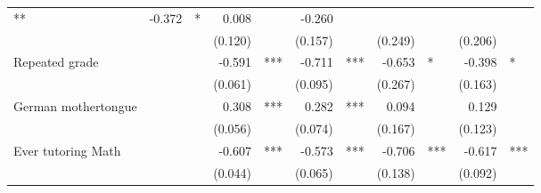\documentclass{article}
\begin{document}
\begin{table}[!h]
\begin{tabular}{lllllllllll}
  \multicolumn{1}{l}{**} &
  \multicolumn{1}{r}{-0.372} &
  \multicolumn{1}{l}{*} &
  \multicolumn{1}{r}{0.008} &
  \multicolumn{1}{l}{} &
  \multicolumn{1}{r}{-0.260} &
  \multicolumn{1}{l}{} \\
\multicolumn{1}{l}{} &
  \multicolumn{1}{r}{} &
  \multicolumn{1}{l}{} &
  \multicolumn{1}{r}{(0.120)} &
  \multicolumn{1}{l}{} &
  \multicolumn{1}{r}{(0.157)} &
  \multicolumn{1}{l}{} &
  \multicolumn{1}{r}{(0.249)} &
  \multicolumn{1}{l}{} &
  \multicolumn{1}{r}{(0.206)} &
  \multicolumn{1}{l}{} \\
\multicolumn{1}{l}{Repeated grade} &
  \multicolumn{1}{r}{} &
  \multicolumn{1}{l}{} &
  \multicolumn{1}{r}{-0.591} &
  \multicolumn{1}{l}{***} &
  \multicolumn{1}{r}{-0.711} &
  \multicolumn{1}{l}{***} &
  \multicolumn{1}{r}{-0.653} &
  \multicolumn{1}{l}{*} &
  \multicolumn{1}{r}{-0.398} &
  \multicolumn{1}{l}{*} \\
\multicolumn{1}{l}{} &
  \multicolumn{1}{r}{} &
  \multicolumn{1}{l}{} &
  \multicolumn{1}{r}{(0.061)} &
  \multicolumn{1}{l}{} &
  \multicolumn{1}{r}{(0.095)} &
  \multicolumn{1}{l}{} &
  \multicolumn{1}{r}{(0.267)} &
  \multicolumn{1}{l}{} &
  \multicolumn{1}{r}{(0.163)} &
  \multicolumn{1}{l}{} \\
\multicolumn{1}{l}{German mothertongue} &
  \multicolumn{1}{r}{} &
  \multicolumn{1}{l}{} &
  \multicolumn{1}{r}{0.308} &
  \multicolumn{1}{l}{***} &
  \multicolumn{1}{r}{0.282} &
  \multicolumn{1}{l}{***} &
  \multicolumn{1}{r}{0.094} &
  \multicolumn{1}{l}{} &
  \multicolumn{1}{r}{0.129} &
  \multicolumn{1}{l}{} \\
\multicolumn{1}{l}{} &
  \multicolumn{1}{r}{} &
  \multicolumn{1}{l}{} &
  \multicolumn{1}{r}{(0.056)} &
  \multicolumn{1}{l}{} &
  \multicolumn{1}{r}{(0.074)} &
  \multicolumn{1}{l}{} &
  \multicolumn{1}{r}{(0.167)} &
  \multicolumn{1}{l}{} &
  \multicolumn{1}{r}{(0.123)} &
  \multicolumn{1}{l}{} \\
\multicolumn{1}{l}{Ever tutoring Math} &
  \multicolumn{1}{r}{} &
  \multicolumn{1}{l}{} &
  \multicolumn{1}{r}{-0.607} &
  \multicolumn{1}{l}{***} &
  \multicolumn{1}{r}{-0.573} &
  \multicolumn{1}{l}{***} &
  \multicolumn{1}{r}{-0.706} &
  \multicolumn{1}{l}{***} &
  \multicolumn{1}{r}{-0.617} &
  \multicolumn{1}{l}{***} \\
\multicolumn{1}{l}{} &
  \multicolumn{1}{r}{} &
  \multicolumn{1}{l}{} &
  \multicolumn{1}{r}{(0.044)} &
  \multicolumn{1}{l}{} &
  \multicolumn{1}{r}{(0.065)} &
  \multicolumn{1}{l}{} &
  \multicolumn{1}{r}{(0.138)} &
  \multicolumn{1}{l}{} &
  \multicolumn{1}{r}{(0.092)} &

\end{tabular}
\end{table}
\end{document}
